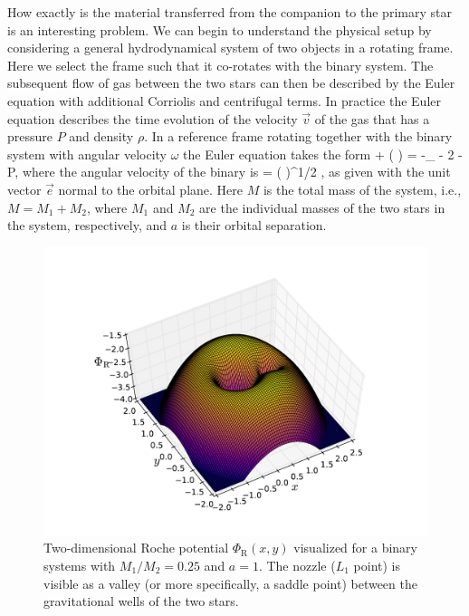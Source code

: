 How exactly is the material transferred from the companion to the primary star is an interesting problem.
We can begin to understand the physical setup by considering a general hydrodynamical system of two objects in a rotating frame.
Here we select the frame such that it co-rotates with the binary system. %
The subsequent flow of gas between the two stars can then be described by the Euler equation with additional Corriolis and centrifugal terms.\cite[see e.g.,][]{Cho98}
In practice the Euler equation describes the time evolution of the velocity $\vec{v}$ of the gas that has a pressure $P$ and density $\rho$.
In a reference frame rotating together with the binary system with angular velocity $\omega$ the Euler equation takes the form 
\be
{} + ( \cdot \nabla) = -\nabla \Phi_{} - 2 \vec{ \omega } \times {} -  \nabla P,
\ee
where the angular velocity of the binary is
\be
\vec{ \omega } = \left(  \right)^{1/2} ,
\ee
as given with the unit vector $\vec{e}$ normal to the orbital plane.
Here $M$ is the total mass of the system, i.e., $M = M_1 + M_2$, where $M_1$ and $M_2$ are the individual masses of the two stars in the system, respectively, and $a$ is their orbital separation.

\begin{figure}[t!]
\includegraphics[width=16cm]{figs/astro/roche.pdf}
\caption{\label{fig:roche}
    Two-dimensional Roche potential $\Phi_{\mathrm{R}}(x,y)$ visualized for a binary systems with $M_1/M_2 = 0.25$ and $a = 1$. 
    The nozzle ($L_1$ point) is visible as a valley (or more specifically, a saddle point) between the gravitational wells of the two stars.
}
\end{figure}

